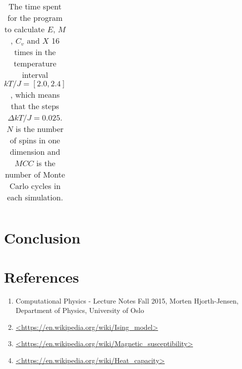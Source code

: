 \documentclass[12pt]{article}
\begin{document}
\begin{flushleft}
\begin{table}[!h]
\begin{center}
\begin{tabular}{| c | c | c | c |}
  \hline
\end{tabular}
\end{center}
\caption{\label{tab:time_spent_T_c}The time spent for the program to calculate $E$, $M$, $C_v$ and $X$ 16 times in the temperature interval $kT/J = [2.0,2.4]$, which means that the steps $\Delta kT/J = 0.025$. $N$ is the number of spins in one dimension and $MCC$ is the number of Monte Carlo cycles in each simulation.}
\end{table}
\newpage

























\newpage
\section{Conclusion}

\section{References}
\begin{enumerate}
	\item Computational Physics - Lecture Notes Fall 2015, Morten Hjorth-Jensen, Department of Physics, University of Oslo
	\item \url{<https://en.wikipedia.org/wiki/Ising_model>}
	\item \url{<https://en.wikipedia.org/wiki/Magnetic_susceptibility>}
	\item \url{<https://en.wikipedia.org/wiki/Heat_capacity>}
\end{enumerate}

















\end{flushleft}
\end{document}
